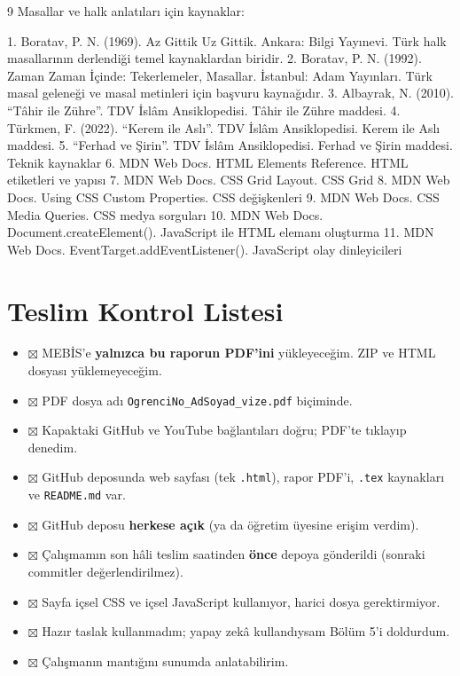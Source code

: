 \documentclass[12pt,a4paper]{article}
\begin{document}
\begin{thebibliography}{9}
Masallar ve halk anlatıları için kaynaklar:

1. Boratav, P. N. (1969). Az Gittik Uz Gittik. Ankara: Bilgi Yayınevi. Türk halk masallarının derlendiği temel kaynaklardan biridir.
2. Boratav, P. N. (1992). Zaman Zaman İçinde: Tekerlemeler, Masallar. İstanbul: Adam Yayınları. Türk masal geleneği ve masal metinleri için başvuru kaynağıdır.
3. Albayrak, N. (2010). “Tâhir ile Zühre”. TDV İslâm Ansiklopedisi. Tâhir ile Zühre maddesi.
4. Türkmen, F. (2022). “Kerem ile Aslı”. TDV İslâm Ansiklopedisi. Kerem ile Aslı maddesi.
5. “Ferhad ve Şirin”. TDV İslâm Ansiklopedisi. Ferhad ve Şirin maddesi.
Teknik kaynaklar
6. MDN Web Docs. HTML Elements Reference. HTML etiketleri ve yapısı
7. MDN Web Docs. CSS Grid Layout. CSS Grid
8. MDN Web Docs. Using CSS Custom Properties. CSS değişkenleri
9. MDN Web Docs. CSS Media Queries. CSS medya sorguları
10. MDN Web Docs. Document.createElement(). JavaScript ile HTML elemanı oluşturma
11. MDN Web Docs. EventTarget.addEventListener(). JavaScript olay dinleyicileri
\end{thebibliography}

\appendix
\section{Teslim Kontrol Listesi}
\begin{itemize}[label={}]
  \item $\boxtimes$ MEBİS'e \textbf{yalnızca bu raporun PDF'ini} yükleyeceğim. ZIP ve HTML dosyası yüklemeyeceğim.
  \item $\boxtimes$ PDF dosya adı \texttt{OgrenciNo\_AdSoyad\_vize.pdf} biçiminde.
  \item $\boxtimes$ Kapaktaki GitHub ve YouTube bağlantıları doğru; PDF'te tıklayıp denedim.
  \item $\boxtimes$ GitHub deposunda web sayfası (tek \texttt{.html}), rapor PDF'i, \texttt{.tex} kaynakları ve \texttt{README.md} var.
  \item $\boxtimes$ GitHub deposu \textbf{herkese açık} (ya da öğretim üyesine erişim verdim).
  \item $\boxtimes$ Çalışmamın son hâli teslim saatinden \textbf{önce} depoya gönderildi (sonraki commitler değerlendirilmez).
  \item $\boxtimes$ Sayfa içsel CSS ve içsel JavaScript kullanıyor, harici dosya gerektirmiyor.
  \item $\boxtimes$ Hazır taslak kullanmadım; yapay zekâ kullandıysam Bölüm 5'i doldurdum.
  \item $\boxtimes$ Çalışmanın mantığını sunumda anlatabilirim.
\end{itemize}
\end{document}
